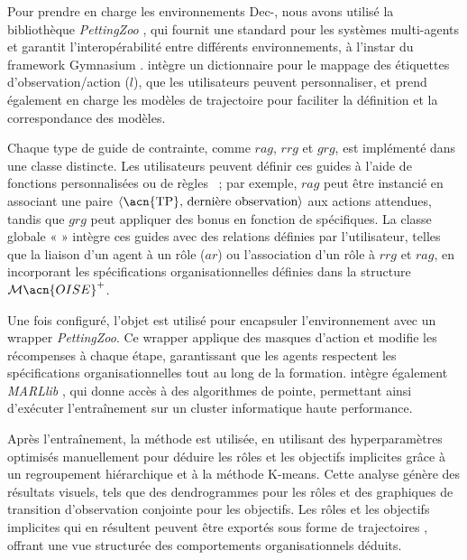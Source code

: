
Pour prendre en charge les environnements Dec-, nous avons utilisé la bibliothèque \textit{PettingZoo} \cite{terry2020pettingzoo}, qui fournit une  standard pour les systèmes multi-agents et garantit l'interopérabilité entre différents environnements, à l'instar du framework Gymnasium \cite{kwiatkowski2024}.  intègre un dictionnaire pour le mappage des étiquettes d'observation/action ($l$), que les utilisateurs peuvent personnaliser, et prend également en charge les modèles de trajectoire  pour faciliter la définition et la correspondance des modèles.

Chaque type de guide de contrainte, comme $rag$, $rrg$ et $grg$, est implémenté dans une classe distincte. Les utilisateurs peuvent définir ces guides à l'aide de fonctions personnalisées ou de règles ~; par exemple, $rag$ peut être instancié en associant une paire $\langle \text{\acn{TP}, dernière observation} \rangle$ aux actions attendues, tandis que $grg$ peut appliquer des bonus en fonction de  spécifiques. La classe globale «  » intègre ces guides avec des relations définies par l'utilisateur, telles que la liaison d'un agent à un rôle ($ar$) ou l'association d'un rôle à $rrg$ et $rag$, en incorporant les spécifications organisationnelles définies dans la structure $\mathcal{M}\acn{OISE}^+$.

Une fois configuré, l'objet  est utilisé pour encapsuler l'environnement avec un wrapper \textit{PettingZoo}. Ce wrapper applique des masques d'action et modifie les récompenses à chaque étape, garantissant que les agents respectent les spécifications organisationnelles tout au long de la formation.  intègre également \textit{MARLlib} \cite{hu2021marlib}, qui donne accès à des algorithmes  de pointe, permettant ainsi d'exécuter l'entraînement sur un cluster informatique haute performance.

Après l'entraînement, la méthode  est utilisée, en utilisant des hyperparamètres optimisés manuellement pour déduire les rôles et les objectifs implicites grâce à un regroupement hiérarchique et à la méthode K-means. Cette analyse génère des résultats visuels, tels que des dendrogrammes pour les rôles et des graphiques de transition d'observation conjointe pour les objectifs. Les rôles et les objectifs implicites qui en résultent peuvent être exportés sous forme de trajectoires , offrant une vue structurée des comportements organisationnels déduits.

